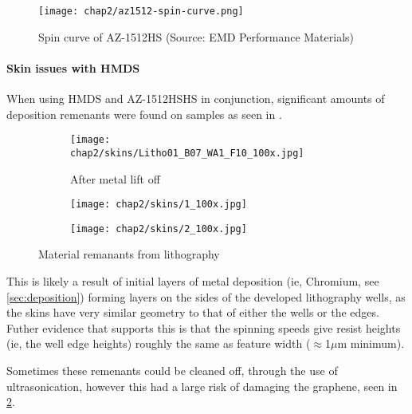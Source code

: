 \documentclass[../../Matt_Gebert_Honours_Thesis.tex]{subfiles}
\begin{document}
	\begin{figure}[H]\label{fig:spin_curve_AZ-1512HS}
		\centering
		\texttt{[image: chap2/az1512-spin-curve.png]}
		\caption{Spin curve of AZ-1512HS (Source: EMD Performance Materials\cite{az1500_series_spincurve})}
	\end{figure}
	
	\paragraph{Skin issues with HMDS}\label{sec:sin_issues}
	When using HMDS and AZ-1512HSHS in conjunction, significant amounts of deposition remenants were found on samples as seen in .%
	
	\begin{figure}[H]
		\centering
		\begin{subfigure}[b]{0.3\textwidth}
			\texttt{[image: chap2/skins/Litho01\_B07\_WA1\_F10\_100x.jpg]}
			\caption{After metal lift off}			
		\end{subfigure}
		\begin{subfigure}[b]{0.3\textwidth}
			\texttt{[image: chap2/skins/1\_100x.jpg]}
		\end{subfigure}
		\begin{subfigure}[b]{0.3\textwidth}
			\texttt{[image: chap2/skins/2\_100x.jpg]}
		\end{subfigure}
		\caption{Material remanants from lithography}\label{fig:lithography_skins}
	\end{figure}
	
	This is likely a result of initial layers of metal deposition (ie, Chromium, see \cref{sec:deposition}) forming layers on the sides of the developed lithography wells, as the skins have very similar geometry to that of either the wells or the edges. Futher evidence that supports this is that the spinning speeds give resist heights (ie, the well edge heights) roughly the same as feature width ($\approx$1$\mu$m minimum).
	
	Sometimes these remenants could be cleaned off, through the use of ultrasonication, however this had a large risk of damaging the graphene, seen in \cref{fig:lithography_skins}.
	
\end{document}
